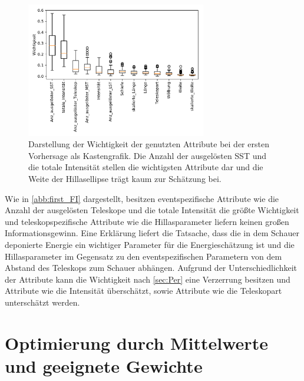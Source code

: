 \begin{figure}
  \includegraphics[width=0.7\textwidth]{Plots/feautureimportance_boxplot_firstForest.pdf}
  \centering
  \caption{Darstellung der Wichtigkeit der genutzten Attribute bei der ersten Vorhersage als Kastengrafik. Die Anzahl der ausgelösten SST und die totale Intensität
          stellen die wichtigsten Attribute dar und die Weite der Hillasellipse trägt kaum zur Schätzung bei.}
  \label{abb:first_FI}
\end{figure}
Wie in \autoref{abb:first_FI} dargestellt, besitzen eventspezifische Attribute wie die Anzahl der ausgelösten Teleskope und die totale Intensität die größte Wichtigkeit und teleskopspezifische Attribute
wie die Hillasparameter liefern keinen großen Informationsgewinn.
Eine Erklärung liefert die Tatsache, dass die in dem Schauer deponierte Energie ein wichtiger Parameter für die Energieschätzung ist und die Hillasparameter im
Gegensatz zu den eventspezifischen Parametern von dem Abstand des Teleskops zum Schauer abhängen.
Aufgrund der Unterschiedlichkeit der Attribute kann die Wichtigkeit nach \autoref{sec:Per} eine Verzerrung besitzen und Attribute
wie die Intensität überschätzt, sowie Attribute wie die Teleskopart unterschätzt werden.

\section{Optimierung durch Mittelwerte und geeignete Gewichte}

